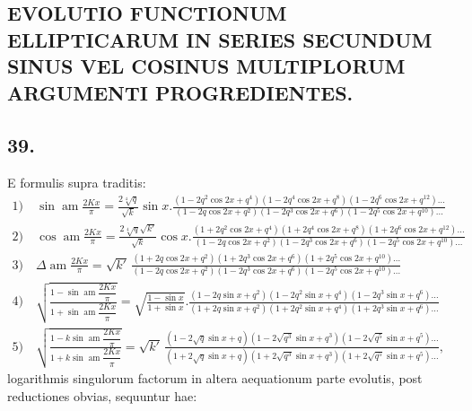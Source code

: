 \documentclass{article}
\begin{document}
\subsection*{EVOLUTIO FUNCTIONUM ELLIPTICARUM IN SERIES SECUNDUM SINUS VEL COSINUS MULTIPLORUM ARGUMENTI PROGREDIENTES.}

\subsection*{39.}

E formulis supra traditis:
\[
\begin{gathered}
\text{1)}\quad\sin\operatorname{am}\frac{2Kx}{\pi}=\frac{2\sqrt[4]{q}}{\sqrt{k}}\sin x.\frac{(1-2q^{2}\cos2x+q^{4})(1-2q^{4}\cos2x+q^{8})(1-2q^{6}\cos2x+q^{12})\ldots}{(1-2q\cos2x+q^{2})(1-2q^{3}\cos2x+q^{6})(1-2q^{5}\cos2x+q^{10})\ldots}\\[1.5ex]
\text{2)}\quad\cos\operatorname{am}\frac{2Kx}{\pi}=\frac{2\sqrt[4]{q}\sqrt{k'}}{\sqrt{k}}\cos x.\frac{(1+2q^{2}\cos2x+q^{4})(1+2q^{4}\cos2x+q^{8})(1+2q^{6}\cos2x+q^{12})\ldots}{(1-2q\cos2x+q^{2})(1-2q^{3}\cos2x+q^{6})(1-2q^{5}\cos2x+q^{10})\ldots}\\[1.5ex]
\text{3)}\quad\Delta\operatorname{am}\frac{2Kx}{\pi}=\sqrt{k'}\,\frac{(1+2q\cos2x+q^{2})(1+2q^{3}\cos2x+q^{6})(1+2q^{5}\cos2x+q^{10})\ldots}{(1-2q\cos2x+q^{2})(1-2q^{3}\cos2x+q^{6})(1-2q^{5}\cos2x+q^{10})\ldots}\\[1.5ex]
\text{4)}\quad\sqrt{\frac{1-\sin\operatorname{am}\dfrac{2Kx}{\pi}}{1+\sin\operatorname{am}\dfrac{2Kx}{\pi}}}=\sqrt{\frac{1-\sin x}{1+\sin x}}.\frac{(1-2q\sin x+q^{2})(1-2q^{2}\sin x+q^{4})(1-2q^{3}\sin x+q^{6})\ldots}{(1+2q\sin x+q^{2})(1+2q^{2}\sin x+q^{4})(1+2q^{3}\sin x+q^{6})\ldots}\\[1.5ex]
\text{5)}\quad\sqrt{\frac{1-k\sin\operatorname{am}\dfrac{2Kx}{\pi}}{1+k\sin\operatorname{am}\dfrac{2Kx}{\pi}}}=\sqrt{k'}\,\frac{(1-2\sqrt{q}\sin x+q)(1-2\sqrt{q^{3}}\sin x+q^{3})(1-2\sqrt{q^{5}}\sin x+q^{5})\ldots}{(1+2\sqrt{q}\sin x+q)(1+2\sqrt{q^{3}}\sin x+q^{3})(1+2\sqrt{q^{5}}\sin x+q^{5})\ldots},
\end{gathered}
\]
logarithmis singulorum factorum in altera aequationum parte evolutis, post reductiones obvias, sequuntur hae:
\end{document}
